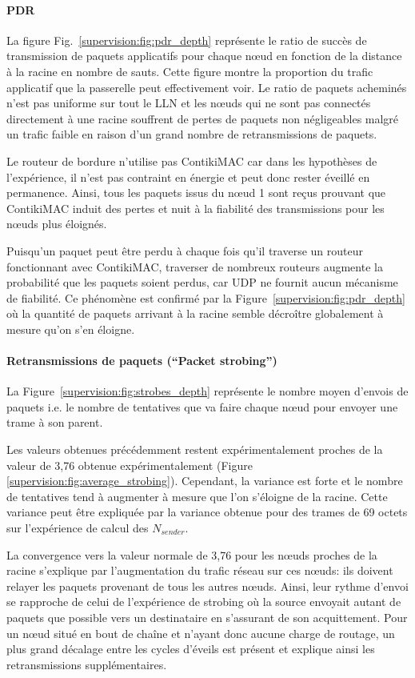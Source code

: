 \paragraph{\ac{PDR}}

La figure Fig.~\ref{supervision:fig:pdr_depth} représente le ratio de succès de transmission de paquets applicatifs pour chaque nœud en fonction de la distance à la racine en nombre de sauts.
Cette figure montre la proportion du trafic applicatif que la passerelle peut effectivement voir.
Le ratio de paquets acheminés n'est pas uniforme sur tout le \ac{LLN} et les nœuds qui ne sont pas connectés directement à une racine souffrent de pertes de paquets non négligeables malgré un trafic faible en raison d'un grand nombre de retransmissions de paquets.

Le routeur de bordure n'utilise pas ContikiMAC car dans les hypothèses de l'expérience, il n'est pas contraint en énergie et peut donc rester éveillé en permanence.
Ainsi, tous les paquets issus du nœud 1 sont reçus prouvant que ContikiMAC induit des pertes et nuit à la fiabilité des transmissions pour les nœuds plus éloignés.

Puisqu'un paquet peut être perdu à chaque fois qu'il traverse un routeur fonctionnant avec ContikiMAC, traverser de nombreux routeurs augmente la probabilité que les paquets soient perdus, car \ac{UDP} ne fournit aucun mécanisme de fiabilité.
Ce phénomène est confirmé par la Figure~\ref{supervision:fig:pdr_depth} où la quantité de paquets arrivant à la racine semble décroître globalement à mesure qu'on s'en éloigne.

\paragraph{Retransmissions de paquets (``Packet strobing'')}

La Figure~\ref{supervision:fig:strobes_depth} représente le nombre moyen d'envois de paquets i.e. le nombre de tentatives que va faire chaque nœud pour envoyer une trame à son parent.

Les valeurs obtenues précédemment restent expérimentalement proches de la valeur de 3,76 obtenue expérimentalement (Figure \ref{supervision:fig:average_strobing}).
Cependant, la variance est forte et le nombre de tentatives tend à augmenter à mesure que l'on s'éloigne de la racine.
Cette variance peut être expliquée par la variance obtenue pour des trames de 69 octets sur l'expérience de calcul des $N_{sender}$.

La convergence vers la valeur normale de 3,76 pour les nœuds proches de la racine s'explique par l'augmentation du trafic réseau sur ces nœuds: ils doivent relayer les paquets provenant de tous les autres nœuds.
Ainsi, leur rythme d'envoi se rapproche de celui de l'expérience de strobing où la source envoyait autant de paquets que possible vers un destinataire en s'assurant de son acquittement.
Pour un nœud situé en bout de chaîne et n'ayant donc aucune charge de routage, un plus grand décalage entre les cycles d'éveils est présent et explique ainsi les retransmissions supplémentaires.

